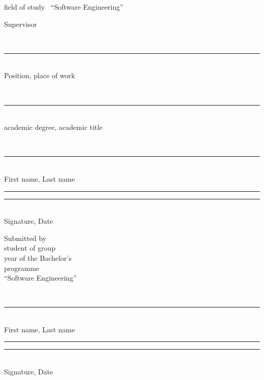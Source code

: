 \begin{titlepage}
\begin{center}
\vspace{0.35cm}
field of study \hseProgramCode\ \enquote{Software Engineering}
\end{center}

\vspace{0.75cm}

\noindent
\begin{minipage}[t]{0.42\textwidth}
\raggedright
Supervisor

\vspace{0.18cm}
\strut\hseSupervisorTitle\\[-0.05cm]
\rule{6.1cm}{0.4pt}\\[-0.05cm]
{\scriptsize Position, place of work}

\vspace{0.08cm}
\strut\hseSupervisorDegree\\[-0.05cm]
\rule{6.1cm}{0.4pt}\\[-0.05cm]
{\scriptsize academic degree, academic title}

\vspace{0.08cm}
\strut\hseSupervisorName\\[-0.05cm]
\rule{6.1cm}{0.4pt}\\[-0.05cm]
{\scriptsize First name, Last name}

\vspace{0.08cm}
\rule{3.6cm}{0.4pt}\quad\rule{2.2cm}{0.4pt}\\[-0.05cm]
{\scriptsize Signature, Date}
\end{minipage}
\hfill
\begin{minipage}[t]{0.42\textwidth}
\raggedright
Submitted by\\
student of group \hseGroup\\
year \hseCourse{} of the Bachelor's\\
programme\\
\enquote{Software Engineering}

\vspace{0.25cm}
\strut\hseAuthorName\\[-0.05cm]
\rule{6.1cm}{0.4pt}\\[-0.05cm]
{\scriptsize First name, Last name}

\vspace{0.18cm}
\rule{3.6cm}{0.4pt}\quad\rule{2.2cm}{0.4pt}\\[-0.05cm]
{\scriptsize Signature, Date}
\end{minipage}


\end{titlepage}
